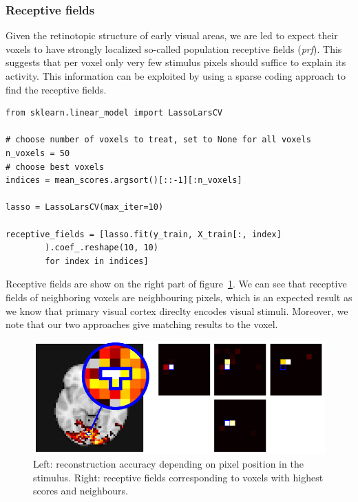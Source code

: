 \documentclass{frontiersSCNS} %
\begin{document}
\subsubsection{Receptive fields}
Given the retinotopic structure of early visual areas, we are led to expect their voxels to have strongly localized so-called population receptive fields (\textit{prf}). This suggests that per voxel only very few stimulus pixels should suffice to explain its activity. This information can be exploited by using a sparse coding approach to find the receptive fields.

\begin{lstlisting}
from sklearn.linear_model import LassoLarsCV

# choose number of voxels to treat, set to None for all voxels
n_voxels = 50
# choose best voxels
indices = mean_scores.argsort()[::-1][:n_voxels]

lasso = LassoLarsCV(max_iter=10)

receptive_fields = [lasso.fit(y_train, X_train[:, index]
        ).coef_.reshape(10, 10)
        for index in indices]

\end{lstlisting}

Receptive fields are show on the right part of figure~\ref{fig:encoding}. We can
see that receptive fields of neighboring voxels are neighbouring pixels, which
is an expected result as we know that primary visual cortex direclty encodes
visual stimuli. Moreover, we note that our two approaches give matching results 
to the voxel.

\begin{figure}[hbtp]
  \begin{center}
    \includegraphics[width=\linewidth]{img/kamitani/figure_encoding}
  \end{center}
  \caption{Left: reconstruction accuracy depending on pixel
           position in the stimulus. Right: receptive fields corresponding to
       voxels with highest scores and neighbours.}
  \label{fig:encoding}
\end{figure}
\end{document}

